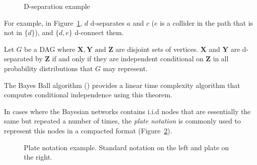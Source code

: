 \begin{figure}[t]
\centering
{}
\caption{D-separation example}\label{fig:d-sep}
\end{figure}

For example, in Figure~\ref{fig:d-sep}, \(d\) d-separates \(a\) and \(c\) (\(e\)
is a collider in the path that is not in \(\{d\}\)),
and \(\{d,e\}\) d-connect them.

\begin{theorem}\label{th:d-separation}
Let \(G\) be a DAG where \(\bm{X}, \bm{Y} \text{ and } \bm{Z}\)
are disjoint sets of vertices. \(\bm{X}\) and \(\bm{Y}\)
are d-separated by \(\bm{Z}\) if and only if they are independent conditional
on \(\bm{Z}\) in all probability distributions that \(G\) may represent.
\end{theorem}

The Bayes Ball algorithm (\cite{bayes_ball}) provides a linear time complexity
algorithm that computes conditional independence using this theorem.

In cases where the Bayesian networks contains i.i.d nodes that are
essentially the same but repeated a number of times, the \emph{plate notation} is commonly used to represent this nodes in a compacted format (Figure~\ref{fig:plate_notation}).

\begin{figure}[t]
\centering
{}
\caption{Plate notation example. Standard notation on the left and plate on the right.}\label{fig:plate_notation}
\end{figure}


